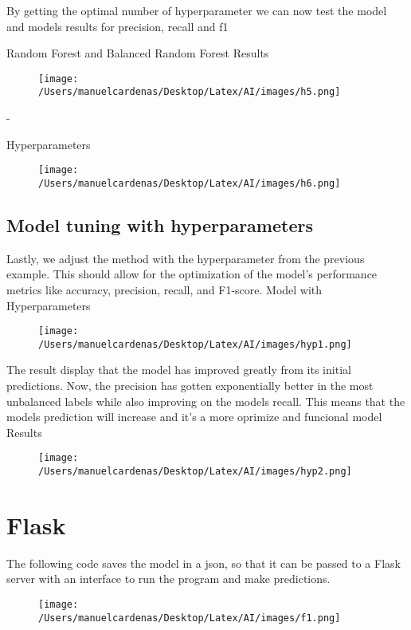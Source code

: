 \documentclass{article}
\begin{document}
    By getting the optimal number of hyperparameter we can now test the model and models results for precision,  recall and f1 \pagebreak

    Random Forest and Balanced Random Forest Results
    \begin{figure}[h]
        \centering
        \texttt{[image: /Users/manuelcardenas/Desktop/Latex/AI/images/h5.png]}
        \label{fig:h5}
    \end{figure}
    - \pagebreak

    Hyperparameters
    \begin{figure}[h]
        \centering
        \texttt{[image: /Users/manuelcardenas/Desktop/Latex/AI/images/h6.png]}
        \label{fig:h6}
    \end{figure}

    \subsection{Model tuning with hyperparameters}

    Lastly, we adjust the method with the hyperparameter from the previous example. This should allow for the optimization
     of the model's performance metrics like accuracy, precision, recall, and F1-score.\pagebreak
     Model with Hyperparameters
     \begin{figure}[h]
         \centering
         \texttt{[image: /Users/manuelcardenas/Desktop/Latex/AI/images/hyp1.png]}
         \label{fig:hyp1}
     \end{figure}
 
     The result display that the model has improved greatly from  its initial predictions.
      Now, the precision has gotten exponentially better in the most unbalanced labels while also improving on the models recall. 
      This means that the models prediction will increase and it's a more oprimize and funcional model\pagebreak
      Results
     \begin{figure}[h]
         \centering
         \texttt{[image: /Users/manuelcardenas/Desktop/Latex/AI/images/hyp2.png]}
         \label{fig:hp2}
     \end{figure}


\section{Flask}
     The following code saves the model in a json, so that it can be passed to a Flask 
     server with an interface to run the program and make predictions.
     \begin{figure}[h]
         \centering
         \texttt{[image: /Users/manuelcardenas/Desktop/Latex/AI/images/f1.png]}
         \label{fig:f1}
     \end{figure}
\end{document}
